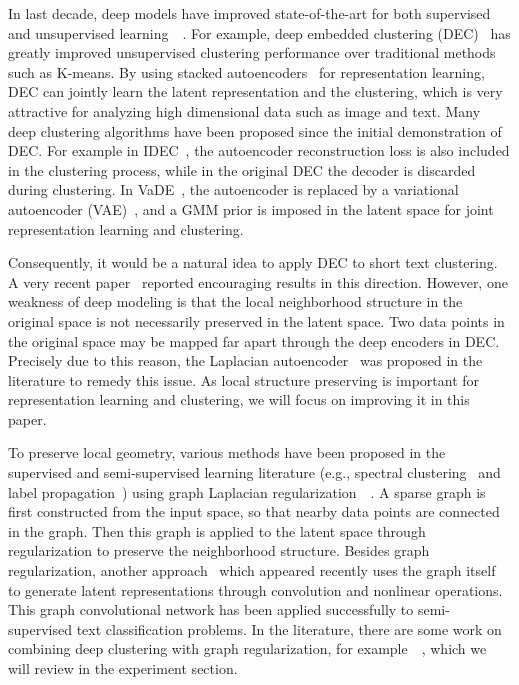 \documentclass[letterpaper]{article}
\begin{document}
In last decade, deep models have improved state-of-the-art for both supervised and unsupervised learning~\cite{imagenet}~\cite{gan}. For example, deep embedded clustering (DEC)~\cite{dec} has greatly improved unsupervised clustering performance over traditional methods such as K-means. By using stacked autoencoders~\cite{autoencoder} for representation learning, DEC can jointly learn the latent representation and the clustering, which is very attractive for analyzing high dimensional data such as image and text. Many deep clustering algorithms have been proposed since the initial demonstration of DEC. For example in IDEC~\cite{idec}, the autoencoder reconstruction loss is also included in the clustering process, while in the original DEC the decoder is discarded during clustering. In VaDE~\cite{vade}, the autoencoder is replaced by a variational autoencoder (VAE)~\cite{vae}, and a GMM prior is imposed in the latent space for joint representation learning and clustering. 

Consequently, it would be a natural idea to apply DEC to short text clustering. A very recent paper~\cite{acl} reported  encouraging results in this direction. However, one weakness of deep modeling is that the local neighborhood structure in the original space is not necessarily preserved in the latent space. Two data points in the original space may be mapped far apart through the deep encoders in DEC. Precisely due to this reason, the Laplacian autoencoder~\cite{lae} was proposed in the literature to remedy this issue. As local structure preserving is important for representation learning and clustering, we will focus on improving it in this paper. 

To preserve local geometry, various methods have been proposed in the supervised and semi-supervised learning literature (e.g., spectral clustering~\cite{sc} and label propagation~\cite{lp}) using graph Laplacian regularization~\cite{belkin}~\cite{niyogi}. A sparse graph is first constructed from the input space, so that nearby data points are connected in the graph. Then this graph is applied to the latent space through regularization to preserve the neighborhood structure. Besides graph regularization, another approach~\cite{gcn} which appeared recently uses the graph itself to generate latent representations through convolution and nonlinear operations. This graph convolutional network has been applied successfully to semi-supervised text classification problems. In the literature, there are some work on combining deep clustering with graph regularization, for example~\cite{lapdmm}~\cite{huawei}, which we will review in the experiment section.
\end{document}
